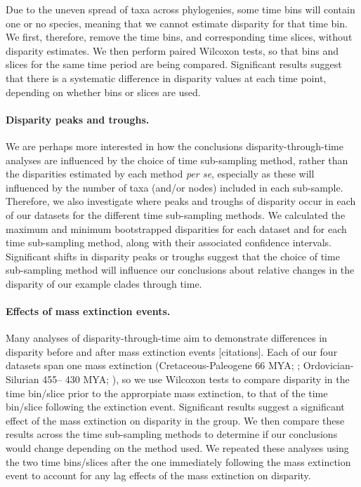 \documentclass[12pt,a4paper]{article}
\begin{document}
Due to the uneven spread of taxa across phylogenies, some time bins will contain one or no species, meaning that we cannot estimate disparity for that time bin. 
We first, therefore, remove the time bins, and corresponding time slices, without disparity estimates. 
We then perform paired Wilcoxon tests, so that bins and slices for the same time period are being compared. 
Significant results suggest that there is a systematic difference in disparity values at each time point, depending on whether bins or slices are used.

\paragraph{Disparity peaks and troughs.}
We are perhaps more interested in how the conclusions disparity-through-time analyses are influenced by the choice of time sub-sampling method, rather than the disparities estimated by each method \textit{per se}, especially as these will influenced by the number of taxa (and/or nodes) included in each sub-sample. 
Therefore, we also investigate where peaks and troughs of disparity occur in each of our datasets for the different time sub-sampling methods. 
We calculated the maximum and minimum bootstrapped disparities for each dataset and for each time sub-sampling method, along with their associated confidence intervals.
Significant shifts in disparity peaks or troughs suggest that the choice of time sub-sampling method will influence our conclusions about relative changes in the disparity of our example clades through time. 

\paragraph{Effects of mass extinction events.}
Many analyses of disparity-through-time aim to demonstrate differences in disparity before and after mass extinction events [citations]. 
Each of our four datasets span one mass extinction (Cretaceous-Paleogene 66 MYA; \citealt{brusatte2014gradual,bapst2016topology,beckancient2014}; Ordovician-Silurian 455– 430 MYA; \citealt{wright2017bayesian}), so we use Wilcoxon tests to compare disparity in the time bin/slice prior to the approrpiate mass extinction, to that of the time bin/slice following the extinction event. 
Significant results suggest a significant effect of the mass extinction on disparity in the group.
We then compare these results across the time sub-sampling methods to determine if our conclusions would change depending on the method used.
We repeated these analyses using the two time bins/slices after the one immediately following the mass extinction event to account for any lag effects of the mass extinction on disparity.
\end{document}
